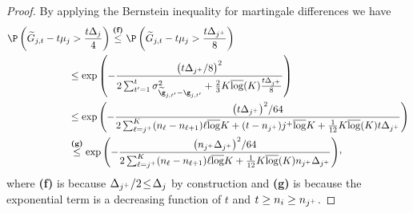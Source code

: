 \begin{proof}
\smallskip \noindent
By applying the Bernstein inequality for martingale  differences  we have
%
\begin{align*}
%
\Pro&\left(\estCumulGainVector_{j,t} - t\mu_j >  
\frac{t\gap_{j}}{4} \right)
\stackrel{\textbf{(f)}}{\leq}
\Pro\left(\estCumulGainVector_{j,t} - t\mu_j >  
\frac{t\gap_{j^+}}{8} \right)\\
&\quad\quad\quad\quad\quad\leq
\exp\left(-
\frac{\left( t\gap_{j^+}/8\right)^2}{2\sum_{t'=1}^t 
	\var_{\estGainVector_{j,t'}-\gainVector_{j,t'}}
+
\frac{2}{3}\nArms\bar\log(\nArms)\frac{t\gap_{j^+}}{8}
}
\right)\\
&\quad\quad\quad\quad\quad\leq
\exp\left(-
\frac{\left(t\gap_{j^+}\right)^2\!/64}{
	2\sum_{\ell=j^+}^{\nArms}
	(\phaseTime_{\ell}-\phaseTime_{\ell+1})
	\ell\bar\log\nArms
	+
	(t-\phaseTime_{j^+})
	j^+\bar\log\nArms
	+
	\frac{1}{12}\nArms\bar\log(\nArms) t\gap_{j^+}
}
\right)\\
&\quad\quad\quad\quad\quad\stackrel{\textbf{(g)}}{\leq}
\exp\left(-
\frac{\left(\phaseTime_{j^+}\gap_{j^+}\right)^2\!/64}{
2	\sum_{\ell=j^+}^{\nArms}
(\phaseTime_{\ell}-\phaseTime_{\ell+1})
	\ell\bar\log\nArms
	+
	\frac{1}{12}\nArms\bar\log(\nArms)\phaseTime_{j^+}\gap_{j^+}
}
\right)\!\CommaBin
%
\end{align*}
%
where \textbf{(f)} is because $\Delta_{j^+}/2\!\leq\!\Delta_j$ 
by construction
and \textbf{(g)} is because the exponential term is a 
decreasing function of $t$ and $t\geq n_i\geq 
n_{j^+ }$.


\end{proof}
